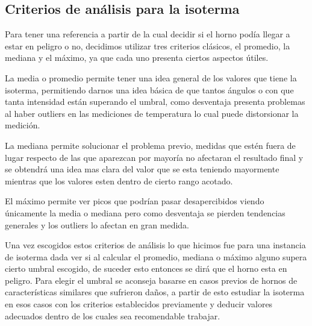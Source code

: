 


\subsection{Criterios de análisis para la isoterma}
 Para tener una referencia a partir de la cual decidir si el horno podía llegar a estar en peligro o no, decidimos utilizar tres criterios clásicos, el promedio, la mediana y el máximo, ya que cada uno presenta ciertos aspectos útiles.
 
  La media o promedio permite tener una idea general de los valores que tiene la isoterma, permitiendo darnos una idea básica de que tantos ángulos o con que tanta intensidad están superando el umbral, como desventaja presenta problemas al haber outliers en las mediciones de temperatura lo cual puede distorsionar la medición.
 
  La mediana permite solucionar el problema previo, medidas que estén fuera de lugar respecto de las que aparezcan por mayoría no afectaran el resultado final y se obtendrá una idea mas clara del valor que se esta teniendo mayormente mientras que los valores esten dentro de cierto rango acotado.
  
   El máximo permite ver picos que podrían pasar desapercibidos viendo únicamente la media o mediana pero como desventaja se pierden tendencias generales y los outliers lo afectan en gran medida.

Una vez escogidos estos criterios de análisis lo que hicimos fue para una instancia de isoterma dada ver si al calcular el promedio, mediana o máximo alguno supera cierto umbral escogido, de suceder esto entonces se dirá que el horno esta en peligro. Para elegir el umbral se aconseja basarse en casos previos de hornos de características similares que sufrieron daños, a partir de esto estudiar la isoterma en esos casos con los criterios establecidos previamente y deducir valores adecuados dentro de los cuales sea recomendable trabajar.

